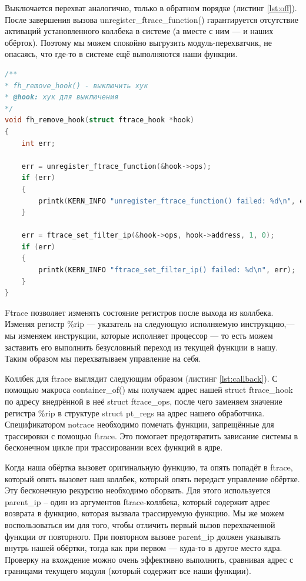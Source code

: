 \documentclass[a4paper,14pt]{article}
\begin{document}
Выключается перехват аналогично, только в обратном порядке (листинг \ref{lst:off}). После завершения вызова unregister\_ftrace\_function() гарантируется отсутствие активаций установленного коллбека в системе (а вместе с ним — и наших обёрток). Поэтому мы можем спокойно выгрузить модуль-перехватчик, не опасаясь, что где-то в системе ещё выполняются наши функции.

\begin{lstlisting}[language=C++,label={lst:off}, caption=\text{Выключение перехвата.}]
/**
* fh_remove_hook() - выключить хук
* @hook: хук для выключения
*/
void fh_remove_hook(struct ftrace_hook *hook)
{
	int err;

	err = unregister_ftrace_function(&hook->ops);
	if (err)
	{
		printk(KERN_INFO "unregister_ftrace_function() failed: %d\n", err);
	}
   
	err = ftrace_set_filter_ip(&hook->ops, hook->address, 1, 0);
	if (err)
	{
		printk(KERN_INFO "ftrace_set_filter_ip() failed: %d\n", err);
    }
}
\end{lstlisting}

Ftrace позволяет изменять состояние регистров после выхода из коллбека. Изменяя регистр \%rip — указатель на следующую исполняемую инструкцию,— мы изменяем инструкции, которые исполняет процессор — то есть можем заставить его выполнить безусловный переход из текущей функции в нашу. Таким образом мы перехватываем управление на себя.

Коллбек для ftrace выглядит следующим образом (листинг \ref{lst:callback}). С помощью макроса container\_of() мы получаем адрес нашей struct ftrace\_hook по адресу внедрённой в неё struct ftrace\_ops, после чего заменяем значение регистра \%rip в структуре struct pt\_regs на адрес нашего обработчика. Спецификатором notrace необходимо помечать функции, запрещённые для трассировки с помощью ftrace. Это помогает предотвратить зависание системы в бесконечном цикле при трассировании всех функций в ядре.

Когда наша обёртка вызовет оригинальную функцию, та опять попадёт в ftrace, который опять вызовет наш коллбек, который опять передаст управление обёртке. Эту бесконечную рекурсию необходимо оборвать. Для этого используется parent\_ip -- один из аргументов ftrace-коллбека, который содержит адрес возврата в функцию, которая вызвала трассируемую функцию. Мы же можем воспользоваться им для того, чтобы отличить первый вызов перехваченной функции от повторного. При повторном вызове parent\_ip должен указывать внутрь нашей обёртки, тогда как при первом — куда-то в другое место ядра. Проверку на вхождение можно очень эффективно выполнить, сравнивая адрес с границами текущего модуля (который содержит все наши функции). 
\end{document}
